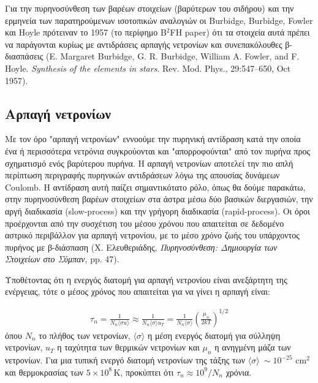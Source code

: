 Για την πυρηνοσύνθεση των βαρέων στοιχείων (βαρύτερων του σιδήρου) και την ερμηνεία των παρατηρούμενων ισοτοπικών αναλογιών οι Burbidge, Burbidge, Fowler και Hoyle πρότειναν το 1957 (το περίφημο B$^2$FH paper) ότι τα στοιχεία αυτά πρέπει να παράγονται κυρίως με αντιδράσεις αρπαγής νετρονίων και συνεπακόλουθες β-διασπάσεις (E. Margaret Burbidge, G. R. Burbidge, William A. Fowler, and F. Hoyle. \textit{Synthesis of the elements in stars}. Rev. Mod. Phys., 29:547–650, Oct 1957).
\subsection{Αρπαγή νετρονίων}
Με τον όρο "αρπαγή νετρονίων" εννοούμε την πυρηνική αντίδραση κατά την οποία ένα ή περισσότερα νετρόνια συγκρούονται και "απορροφούνται" από τον πυρήνα προς σχηματισμό ενός βαρύτερου πυρήνα. Η αρπαγή νετρονίων αποτελεί την πιο απλή περίπτωση περιγραφής πυρηνικών αντιδράσεων λόγω της απουσίας δυνάμεων Coulomb. Η αντίδραση αυτή παίζει σημαντικότατο ρόλο, όπως θα δούμε παρακάτω, στην πυρηνοσύνθεση βαρέων στοιχείων στα άστρα μέσω δύο βασικών διεργασιών, την αργή διαδικασία (slow-process) και την γρήγορη διαδικασία (rapid-process). Οι όροι προέρχονται από την συσχέτιση του μέσου χρόνου που απαιτείται σε δεδομένο αστρικό περιβάλλον για αρπαγή νετρονίου, με το μέσο χρόνο ζωής του υπάρχοντος πυρήνος με β-διάσπαση (Χ. Ελευθεριάδης, \textit{Πυρηνοσύνθεση: Δημιουργία των Στοιχείων στο Σύμπαν}, pp. 47). 

Υποθέτοντας ότι η ενεργός διατομή για αρπαγή νετρονίου είναι ανεξάρτητη της ενέργειας, τότε ο μέσος χρόνος που απαιτείται για να γίνει η αρπαγή είναι:

\begin{eqnarray}
\label{eq:apx:mean_time_neutron_capture}
\tau_n = \frac{1}{N_n \langle \sigma u \rangle}\approx \frac{1}{N_n \langle \sigma \rangle u_T} = \frac{1}{N_n \langle \sigma \rangle} \left ( \frac{\mu_n}{2kT} \right )^{1/2} 
\end{eqnarray}     
όπου  $N_n$ το πλήθος των νετρονίων, $\langle \sigma \rangle$ η μέση ενεργός διατομή για σύλληψη νετρονίων, $u_T$ η ταχύτητα των θερμικών νετρονίων και $\mu_n$ η ανηγμένη μάζα των νετρονίων. Για μια τυπική ενεργό διατομή νετρονίων της τάξης των $\langle \sigma \rangle \ \sim 10^{-25}$ cm$^2$ και θερμοκρασίας των $5 \times 10^8 \,\text{K}$, προκύπτει ότι $\tau_n \approx 10^9/N_n$ χρόνια.

